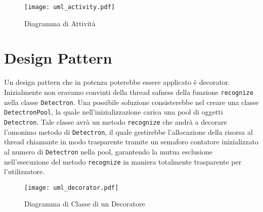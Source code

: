\documentclass[12pt,a4paper]{article}
\begin{document}
\begin{figure}[p]
  \caption{Diagramma di Attività}
  \centering
  \texttt{[image: uml\_activity.pdf]}
\end{figure}

\pagebreak

\section{Design Pattern}

Un design pattern che in potenza poterebbe essere applicato è
decorator.\\
Inizialmente non eravamo convinti della thread safness
della funzione \texttt{recognize} nella classe \texttt{Detectron}. Una
possibile soluzione consisterebbe nel creare una classe
\texttt{DetectronPool}, la quale nell'inizializzazione carica una pool
di oggetti \texttt{Detectron}. Tale classe avrà un metodo
\texttt{recognize} che andrà a decorare l'omonimo metodo di
\texttt{Detectron}, il quale gestirebbe l'allocazione della risorsa al
thread chiamante in modo trasparente tramite un semaforo contatore
inizializzato al numero di \texttt{Detectron} nella pool, garantendo la
mutua esclusione nell'esecuzione del metodo \texttt{recognize} in
maniera totalmente trasparente per l'utilizzatore.

\begin{figure}[h]
  \caption{Diagramma di Classe di un Decoratore}
  \centering
  \texttt{[image: uml\_decorator.pdf]}
\end{figure}
\end{document}
